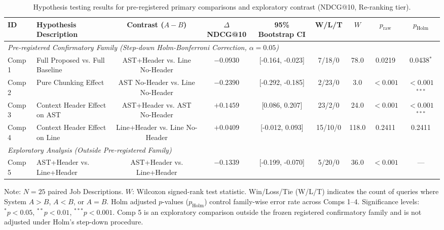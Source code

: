 \begin{table}[t]
\caption{Hypothesis testing results for pre-registered primary comparisons and exploratory contrast (NDCG@10, Re-ranking tier).}
\label{tab:statistical_hypothesis_tests}
\centering\scriptsize
\setlength{\tabcolsep}{2.5pt}
\begin{threeparttable}
\begin{tabular}{@{}llccccccc@{}}
\toprule
ID & Hypothesis Description & Contrast ($A - B$) & $\Delta$ NDCG@10 & 95\% Bootstrap CI & W/L/T & $W$ & $p_{\mathrm{raw}}$ & $p_{\mathrm{Holm}}$ \\
\midrule
\multicolumn{9}{l}{\textit{Pre-registered Confirmatory Family (Step-down Holm-Bonferroni Correction, $\alpha=0.05$)}} \\[2pt]
Comp 1 & Full Proposed vs. Full Baseline & AST+Header vs. Line No-Header & $-0.0930$ & [-0.164, -0.023] & 7/18/0 & 78.0 & 0.0219 & 0.0438$^{*}$ \\
Comp 2 & Pure Chunking Effect & AST No-Header vs. Line No-Header & $-0.2390$ & [-0.292, -0.185] & 2/23/0 & 3.0 & $<0.001$ & $<0.001$$^{***}$ \\
Comp 3 & Context Header Effect on AST & AST+Header vs. AST No-Header & $+0.1459$ & [0.086, 0.207] & 23/2/0 & 24.0 & $<0.001$ & $<0.001$$^{***}$ \\
Comp 4 & Context Header Effect on Line & Line+Header vs. Line No-Header & $+0.0409$ & [-0.012, 0.093] & 15/10/0 & 118.0 & 0.2411 & 0.2411 \\
\midrule
\multicolumn{9}{l}{\textit{Exploratory Analysis (Outside Pre-registered Family)}} \\[2pt]
Comp 5 & AST+Header vs. Line+Header & AST+Header vs. Line+Header & $-0.1339$ & [-0.199, -0.070] & 5/20/0 & 36.0 & $<0.001$ & --- \\
\bottomrule
\end{tabular}
\begin{tablenotes}\footnotesize
\item[] Note: $N=25$ paired Job Descriptions. $W$: Wilcoxon signed-rank test statistic. Win/Loss/Tie (W/L/T) indicates the count of queries where System $A > B$, $A < B$, or $A = B$. Holm adjusted $p$-values ($p_{\mathrm{Holm}}$) control family-wise error rate across Comps 1--4. Significance levels: $^{*}p < 0.05$, $^{**}p < 0.01$, $^{***}p < 0.001$. Comp 5 is an exploratory comparison outside the frozen registered confirmatory family and is not adjusted under Holm's step-down procedure.
\end{tablenotes}
\end{threeparttable}
\end{table}
